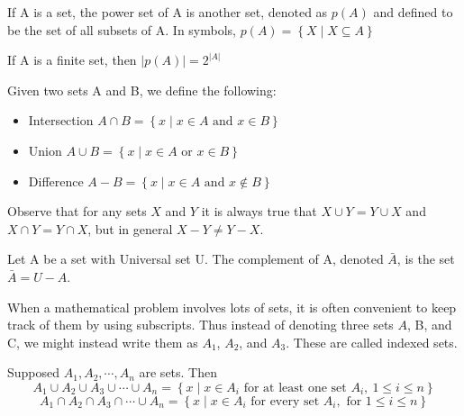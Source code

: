 \begin{definition}
     If A is a set, the power set of A is another set, denoted as $p(A)$ and defined to be the set of all subsets of A. 
    In symbols, $p(A) = \left\{X  \mid  X \subseteq A\right\}$
\end{definition}
\begin{remark}
    If A is a finite set, then $\left|p(A)\right| = 2^{\left|A\right|}$
\end{remark}
\begin{definition}
    Given two sets A and B, we define the following:
    \begin{itemize}
        \item Intersection $A \cap B = \left\{x \mid x \in A \text{ and } x \in B\right\}$
        \item Union $A \cup B = \left\{x \mid x \in A \text{ or } x \in B\right\}$
        \item Difference $A - B = \left\{x \mid x \in A \text{ and } x \notin B\right\}$
    \end{itemize}
\end{definition}

Observe that for any sets $X$ and $Y$ it is always true that $X \cup Y = Y \cup X$ and $X \cap Y = Y \cap X$, but in general $X - Y \neq Y - X$.

\begin{definition}
    [Complement]
    Let A be a set with Universal set U. The complement of A, denoted $\bar{A}$, is the set $\bar{A} = U - A$.
\end{definition}

When a mathematical problem involves lots of sets, it is often convenient to keep track of them by using subscripts.
Thus instead of denoting three sets $A$, B, and C, we might instead write them as $A_1$, $A_2$, and $A_3$. These are called indexed sets. 
\begin{definition}
    Supposed $A_1, A_2, \cdots, A_n$ are sets. Then 
    \begin{equation*}
        A_1 \cup A_2 \cup A_3 \cup \cdots \cup A_n
        =
        \left\{
        x \mid x \in A_i \text{ for at least one set } A_i,\ 1 \leq i \leq n
        \right\}
    \end{equation*}  
    \begin{equation*}
        A_1 \cap A_2 \cap A_3 \cap \cdots \cup A_n
        =
        \left\{
            x \mid x \in A_i \text{ for every set } A_i, \text{ for } 1 \leq i \leq n
        \right\}
    \end{equation*}
\end{definition}


